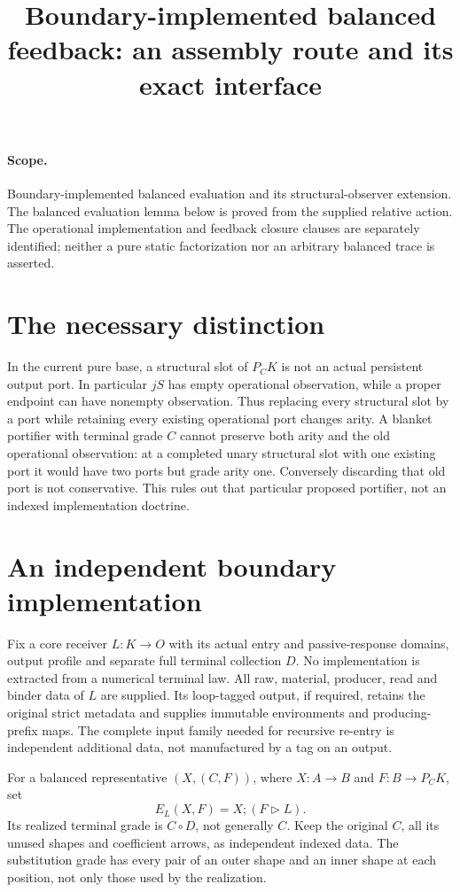 \documentclass{article}
\title{Boundary-implemented balanced feedback: an assembly route and its exact interface}
\begin{document}
\maketitle
\paragraph{Scope.} Boundary-implemented balanced evaluation and its structural-observer extension. The balanced evaluation lemma below is proved from the supplied relative action. The operational implementation and feedback closure clauses are separately identified; neither a pure static factorization nor an arbitrary balanced trace is asserted.

\section{The necessary distinction}
In the current pure base, a structural slot of $P_CK$ is not an actual persistent output port. In particular $jS$ has empty operational observation, while a proper endpoint can have nonempty observation. Thus replacing every structural slot by a port while retaining every existing operational port changes arity. A blanket portifier with terminal grade $C$ cannot preserve both arity and the old operational observation: at a completed unary structural slot with one existing port it would have two ports but grade arity one. Conversely discarding that old port is not conservative. This rules out that particular proposed portifier, not an indexed implementation doctrine.

\section{An independent boundary implementation}
Fix a core receiver $L:K\to O$ with its actual entry and passive-response domains, output profile and separate full terminal collection $D$. No implementation is extracted from a numerical terminal law. All raw, material, producer, read and binder data of $L$ are supplied. Its loop-tagged output, if required, retains the original strict metadata and supplies immutable environments and producing-prefix maps. The complete input family needed for recursive re-entry is independent additional data, not manufactured by a tag on an output.

For a balanced representative $(X,(C,F))$, where $X:A\to B$ and $F:B\to P_CK$, set
\[
 E_L(X,F)=X;(F\triangleright L).
\]
Its realized terminal grade is $C\circ D$, not generally $C$. Keep the original $C$, all its unused shapes and coefficient arrows, as independent indexed data. The substitution grade has every pair of an outer shape and an inner shape at each position, not only those used by the realization.
\end{document}

